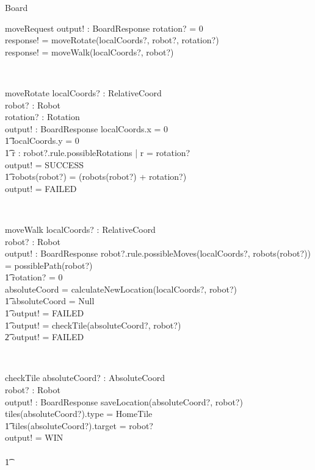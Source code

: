 \documentclass[12pt]{article}
\begin{document}
\begin{class}{Board}
\begin{schema}{moveRequest}
output! : BoardResponse
\where
\IF rotation? \not = 0 \\
\THEN response! = moveRotate(localCoords?, robot?, rotation?) \\
\ELSE response! = moveWalk(localCoords?, robot?)
\end{schema} \\
\begin{schema}{moveRotate}
localCoords? : RelativeCoord \\
robot? : Robot \\
rotation? : Rotation \\
output! : BoardResponse
\where
\IF localCoords.x = 0 \\ \t1
localCoords.y = 0 \\ \t1
 \exists r : robot?.rule.possibleRotations | r = rotation?\\
\THEN output! = SUCCESS \\ \t1
robots(robot?) = (robots(robot?) + rotation?)  \\
\ELSE output! = FAILED
\end{schema} \\
\znewpage
\begin{schema}{moveWalk}
localCoords? : RelativeCoord \\
robot? : Robot \\
output! : BoardResponse
\where
\IF robot?.rule.possibleMoves(localCoords?, robots(robot?)) = possiblePath(robot?) \\ \t1
rotation? = 0 \\
\THEN absoluteCoord = calculateNewLocation(localCoords?, robot?)\\ \t1
\IF absoluteCoord = Null \\ \t1
\THEN output! = FAILED \\ \t1
\ELSE output! = checkTile(absoluteCoord?, robot?)\\ \t2
\ELSE output! = FAILED
\end{schema} \\
\begin{schema}{checkTile}
absoluteCoord? : AbsoluteCoord \\
robot? : Robot \\
output! : BoardResponse
\where
saveLocation(absoluteCoord?, robot?) \\
\IF tiles(absoluteCoord?).type = HomeTile \\ \t1
tiles(absoluteCoord?).target = robot? \\
\THEN output! = WIN \\ \
\ELSE  \\ \t1

\end{schema}
\end{class}
\end{document}
